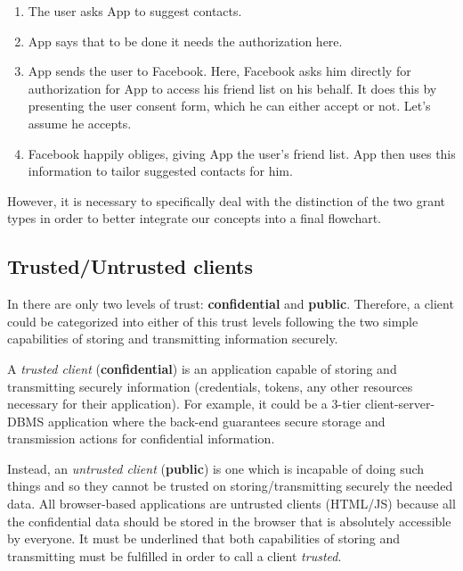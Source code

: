 \begin{enumerate}
    \item The user asks App to suggest contacts.
    \item App says that to be done it needs the authorization here.
    \item App sends the user to Facebook. Here, Facebook asks him directly for authorization for App to access his friend list on his behalf. It does this by presenting the user consent form, which he can either accept or not. Let's assume he accepts.
    \item Facebook happily obliges, giving App the user's friend list. App then uses this information to tailor suggested contacts for him.
\end{enumerate}

However, it is necessary to specifically deal with the distinction of the two grant types in order to better integrate our concepts into a final flowchart.

\subsection{Trusted/Untrusted clients}

In \textit{\oauth} there are only two levels of trust: \textbf{confidential} and \textbf{public}. 
Therefore, a client could be categorized into either of this trust levels following the two simple capabilities of storing and transmitting information securely.

A \textit{trusted client} (\textbf{confidential}) is an application capable of storing and transmitting securely information (credentials, tokens, any other resources necessary for their application).
For example, it could be a 3-tier client-server-DBMS application where the back-end guarantees secure storage and transmission actions for confidential information. 

Instead, an \textit{untrusted client} (\textbf{public}) is one which is incapable of doing such things and so they cannot be trusted on storing/transmitting securely the needed data. All browser-based applications are untrusted clients (HTML/JS) because all the confidential data should be stored in the browser that is absolutely accessible by everyone.
It must be underlined that both capabilities of storing and transmitting must be fulfilled in order to call a client \textit{trusted}.

